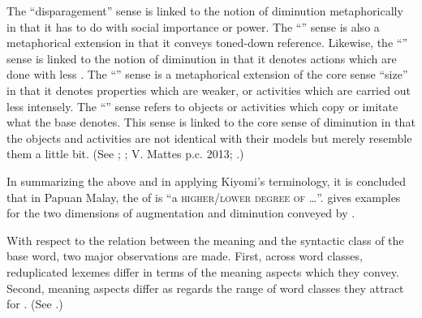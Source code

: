 {The ``disparagement'' sense is linked to the notion of diminution metaphorically in that it has to do with social importance or power. The ``'' sense is also a metaphorical extension in that it conveys toned-down reference. Likewise, the ``'' sense is linked to the notion of diminution in that it denotes actions which are done with less . The ``'' sense is a metaphorical extension of the core sense ``size'' in that it denotes properties which are weaker, or activities which are carried out less intensely. The ``'' sense refers to objects or activities which copy or imitate what the base denotes. This sense is linked to the core sense of diminution in that the objects and activities are not identical with their models but merely resemble them a little bit. (See \citealt[426, 430]{Jurafsky.1993}; \citealt[125]{Mattes.2007}; V. Mattes p.c. 2013; \citealt[129--130]{Moravcsik.2013}.)

In summarizing the above and in applying Kiyomi’s \citeyearpar[1151]{Kiyomi.2009} terminology, it is concluded that in Papuan Malay, the  of  is ``a \textsc{higher}/\textsc{lower} \textsc{degree} \textsc{of} \ldots''.  gives examples for the two dimensions of augmentation and diminution conveyed by .


\begin{table}
\caption{ Gesamtbedeutung of reduplication}\label{Table_4.7}
\end{table}

With respect to the relation between the meaning and the syntactic class of the base word, two major observations are made. First, across word classes, reduplicated lexemes differ in terms of the meaning aspects which they convey. Second, meaning aspects differ as regards the range of word classes they attract for . (See .)



}
